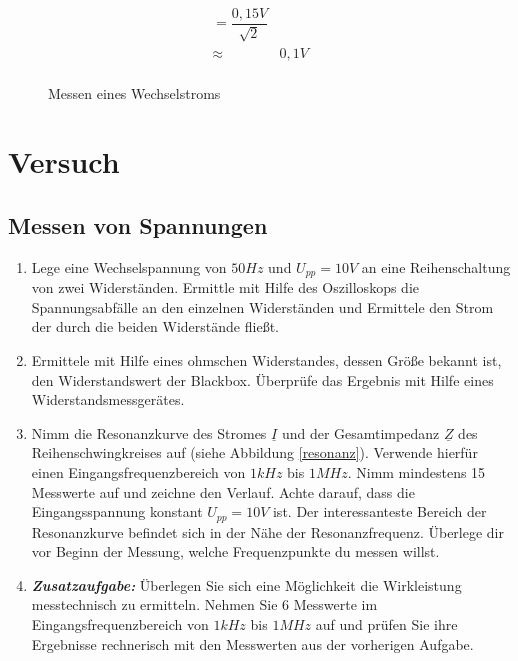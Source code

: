 \begin{figure}[H]
{\begin{minipage}[b]{5cm}
\begin{eqnarray*}
				= \dfrac{0,15V}{\sqrt{2}}\\
 		\approx	& 0,1V\\
\end{eqnarray*}
\end{minipage}
}
\caption{Messen eines Wechselstroms}
\end{figure}

\newpage
\section*{Versuch}

\subsection*{Messen von Spannungen}

\begin{enumerate}
\item Lege eine Wechselspannung von $50Hz$ und  $U_{pp} =10V$ an eine Reihenschaltung von zwei Widerständen. Ermittle mit Hilfe des Oszilloskops die Spannungsabfälle an den einzelnen Widerständen und Ermittele den Strom der durch die beiden Widerstände fließt.
\item Ermittele mit Hilfe eines ohmschen Widerstandes, dessen Größe bekannt ist, den Widerstandswert der Blackbox. Überprüfe das Ergebnis mit Hilfe eines Widerstandsmessgerätes.
\item Nimm die Resonanzkurve des Stromes $\underline{I}$ und der Gesamtimpedanz $\underline{Z}$ des Reihenschwingkreises auf (siehe Abbildung \ref{resonanz}). Verwende hierfür einen Eingangsfrequenzbereich von $1kHz$ bis $1MHz$. Nimm mindestens 15 Messwerte auf und zeichne den Verlauf. Achte darauf, dass die Eingangsspannung konstant $U_{pp} =10V$ ist. Der interessanteste Bereich der Resonanzkurve befindet sich in der Nähe der Resonanzfrequenz. Überlege dir vor Beginn der Messung, welche Frequenzpunkte du messen willst.
\item \emph{\textbf{Zusatzaufgabe:}} Überlegen Sie sich eine Möglichkeit die Wirkleistung messtechnisch zu ermitteln. Nehmen Sie 6 Messwerte im Eingangsfrequenzbereich von $1kHz$ bis $1MHz$ auf und prüfen Sie ihre Ergebnisse rechnerisch mit den Messwerten aus der vorherigen Aufgabe.
\end{enumerate}

